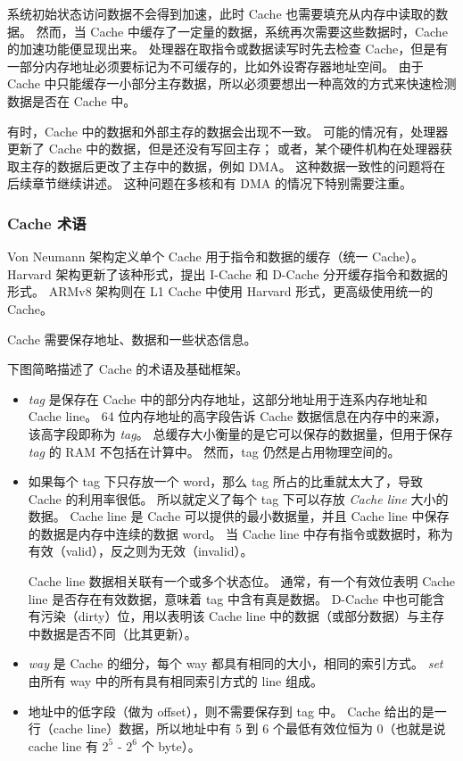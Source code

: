系统初始状态访问数据不会得到加速，此时 Cache 也需要填充从内存中读取的数据。
然而，当 Cache 中缓存了一定量的数据，系统再次需要这些数据时，Cache 的加速功能便显现出来。
处理器在取指令或数据读写时先去检查 Cache，但是有一部分内存地址必须要标记为不可缓存的，比如外设寄存器地址空间。
由于 Cache 中只能缓存一小部分主存数据，所以必须要想出一种高效的方式来快速检测数据是否在 Cache 中。

有时，Cache 中的数据和外部主存的数据会出现不一致。
可能的情况有，处理器更新了 Cache 中的数据，但是还没有写回主存；
或者，某个硬件机构在处理器获取主存的数据后更改了主存中的数据，例如 DMA。
这种数据一致性的问题将在后续章节继续讲述。
这种问题在多核和有 DMA 的情况下特别需要注重。

\subsubsection{Cache 术语}

Von Neumann 架构定义单个 Cache 用于指令和数据的缓存（统一 Cache）。
Harvard 架构更新了该种形式，提出 I-Cache 和 D-Cache 分开缓存指令和数据的形式。
ARMv8 架构则在 L1 Cache 中使用 Harvard 形式，更高级使用统一的 Cache。

Cache 需要保存地址、数据和一些状态信息。

下图简略描述了 Cache 的术语及基础框架。


\begin{itemize}
  \item \textit{tag} 是保存在 Cache 中的部分内存地址，这部分地址用于连系内存地址和 Cache line。
    64 位内存地址的高字段告诉 Cache 数据信息在内存中的来源，该高字段即称为 \textit{tag}。
    总缓存大小衡量的是它可以保存的数据量，但用于保存 \textit{tag} 的 RAM 不包括在计算中。
    然而，tag 仍然是占用物理空间的。
  \item 如果每个 tag 下只存放一个 word，那么 tag 所占的比重就太大了，导致 Cache 的利用率很低。
    所以就定义了每个 tag 下可以存放 \textit{Cache line} 大小的数据。
    Cache line 是 Cache 可以提供的最小数据量，并且 Cache line 中保存的数据是内存中连续的数据 word。
    当 Cache line 中存有指令或数据时，称为有效（valid），反之则为无效（invalid）。

    Cache line 数据相关联有一个或多个状态位。
    通常，有一个有效位表明 Cache line 是否存在有效数据，意味着 tag 中含有真是数据。
    D-Cache 中也可能含有污染（dirty）位，用以表明该 Cache line 中的数据（或部分数据）与主存中数据是否不同（比其更新）。
  \item \textit{way} 是 Cache 的细分，每个 way 都具有相同的大小，相同的索引方式。
    \textit{set} 由所有 way 中的所有具有相同索引方式的 line 组成。
  \item 地址中的低字段（做为 offset），则不需要保存到 tag 中。
    Cache 给出的是一行（cache line）数据，所以地址中有 5 到 6 个最低有效位恒为 0（也就是说 cache line 有 $2^5$ - $2^6$ 个 byte）。
\end{itemize}

